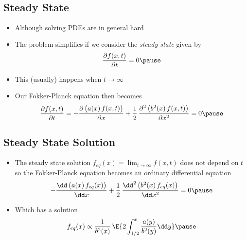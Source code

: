 \begin{slide}
\section{Steady State}

\begin{PauseHighLight}
  \begin{itemize}
  \item Although solving PDEs are in general hard\pause
  \item The problem simplifies if we consider the \textit{steady state}
    given by
    \begin{align*}
      \frac{\partial f(x,t)}{\partial t} = 0\pause
    \end{align*}
  \item This (usually) happens when $t\rightarrow \infty$\pause
  \item Our Fokker-Planck equation then becomes
  \begin{align*}
    \frac{\partial f(x,t)}{\partial t} = -\frac{\partial \left(\strut
        a(x)\,f(x,t)\right)}{\partial x} + \frac{1}{2}\,
    \frac{\partial^2 \left(\strut b^2(x)\,f(x,t)\right)}{\partial x^2} =
    0\pause
  \end{align*}
  \end{itemize}
\end{PauseHighLight}

\end{slide}


\begin{slide}
\section{Steady State Solution}

\begin{PauseHighLight}
  \begin{itemize}
  \item The steady state solution $f_{eq}(x) = \lim_{t\rightarrow
      \infty} f(x,t)$ does not depend on $t$ so the Fokker-Planck
    equation becomes an ordinary differential equation
    \begin{align*}
      -\frac{\dd  \left(\strut
      a(x)\,f_{eq}(x)\right)}{\dd  x} + \frac{1}{2}\,
      \frac{\dd ^2 \left(\strut b^2(x)\,f_{eq}(x)\right)}{\dd  x^2} =
      0\pause
    \end{align*}
  \item Which has a solution
    \begin{align*}
      f_{eq}(x) \propto \frac{1}{b^2(x)} \, \E{2 \int_{1/2}^x
      \frac{a(y)}{b^2(y)} \dd y}\pause
    \end{align*}
  \end{itemize}
\end{PauseHighLight}

\end{slide}


